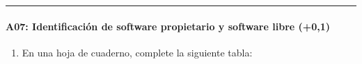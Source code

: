 \documentclass[letterpaper,10pt,spanish]{sphinxmanual}
\begin{document}
\bigskip\hrule\bigskip



\paragraph{A07: Identificación de software propietario y software libre (+0,1)}
\label{\detokenize{cursos/ofimatica10/periodo01/G02:a07-identificacion-de-software-propietario-y-software-libre-0-1}}
\sphinxAtStartPar
{}
\begin{enumerate}
%
\item {} 
\sphinxAtStartPar
En una hoja de cuaderno, complete la siguiente tabla:

\end{enumerate}
\end{document}
